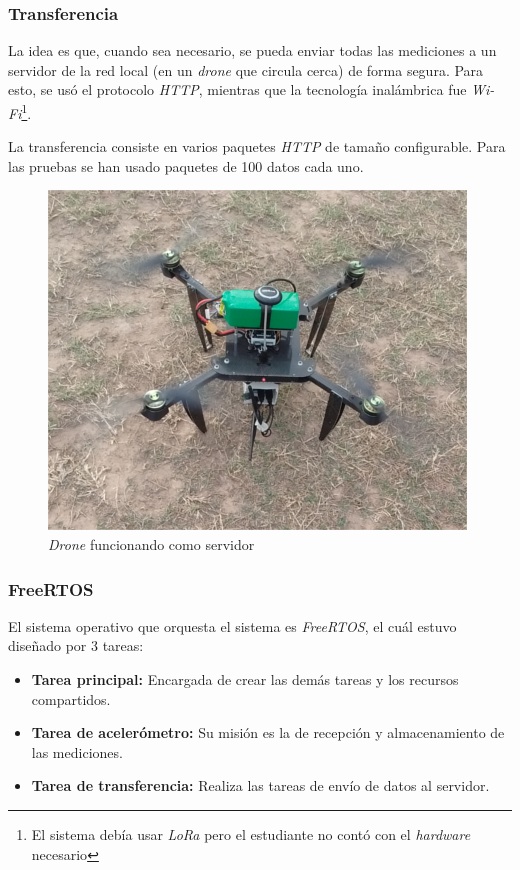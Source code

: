 \documentclass{article}
\newcommand{ \fnwifi }{\footnote{El sistema debía usar \emph{LoRa} pero el estudiante no contó con el \emph{hardware} necesario}}
\begin{document}
    \subsubsection{Transferencia}
    La idea es que, cuando sea necesario, se pueda enviar todas las mediciones
    a un servidor de la red local (en un \emph{drone} que circula cerca) de 
    forma segura. Para esto, se usó el protocolo \emph{HTTP}, mientras que 
    la tecnología inalámbrica fue \emph{Wi-Fi}\fnwifi. \par
    La transferencia consiste en varios paquetes \emph{HTTP} de tamaño 
    configurable. Para las pruebas se han usado paquetes de 100 datos cada uno.

    \begin{figure}[h]
        \includegraphics[width=0.8 \textwidth, center]{drone.jpg}
        \caption{\emph{Drone} funcionando como servidor}
        \label{fig:drone}
    \end{figure}

    \subsubsection{FreeRTOS}
    El sistema operativo que orquesta el sistema es \emph{FreeRTOS}, el cuál
    estuvo diseñado por 3 tareas:
    \begin{itemize}
        \item \textbf{Tarea principal:} Encargada de crear las demás tareas y 
        los recursos compartidos.
        \item \textbf{Tarea de acelerómetro:} Su misión es la de recepción y 
        almacenamiento de las mediciones.
        \item \textbf{Tarea de transferencia:} Realiza las tareas de envío
        de datos al servidor.
    \end{itemize}
\end{document}
